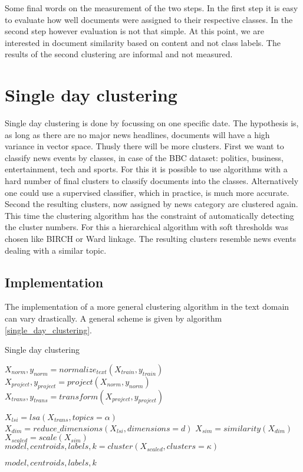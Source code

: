 Some final words on the measurement of the two steps. In the first step it is easy to evaluate how well documents were assigned to their respective classes. In the second step however evaluation is not that simple. At this point, we are interested in document similarity based on content and not class labels. The results of the second clustering are informal and not measured.

\section{Single day clustering}

Single day clustering is done by focussing on one specific date. The hypothesis is, as long as there are no major news headlines, documents will have a high variance in vector space. Thusly there will be more clusters. First we want to classify news events by classes, in case of the BBC dataset: politics, business, entertainment, tech and sports. For this it is possible to use algorithms with a hard number of final clusters to classify documents into the classes. Alternatively one could use a supervised classifier, which in practice, is much more accurate. Second the resulting clusters, now assigned by news category are clustered again. This time the clustering algorithm has the constraint of automatically detecting the cluster numbers. For this a hierarchical algorithm with soft thresholds was chosen like BIRCH or Ward linkage. The resulting clusters resemble news events dealing with a similar topic.

  \subsection{Implementation}
  The implementation of a more general clustering algorithm in the text domain can vary drastically. A general scheme is given by algorithm \ref{single_day_clustering}.

    \begin{algorithm}[H]
    \begin{algorithmic}[1]
      \caption{Single day clustering}\label{single_day_clustering}
        \State $X_{norm},y_{norm} = normalize_{text}(X_{train},y_{train})$
        \State $X_{project},y_{project} = project(X_{norm},y_{norm})$
        \State $X_{trans},y_{trans} = transform(X_{project},y_{project})$

        \State $X_{lsi} = lsa(X_{trans}, topics=\alpha)$
        \State $X_{dim} = reduce\_dimensions(X_{lsi}, dimensions=d)$
        \State $X_{sim} = similarity(X_{dim})$
        \State $X_{scaled} = scale(X_{sim})$
        \State $model,centroids,labels,k = cluster(X_{scaled}, clusters=\kappa)$

        \State \Return $model,centroids,labels,k$
      \EndFunction
    \end{algorithmic}
    \end{algorithm}

